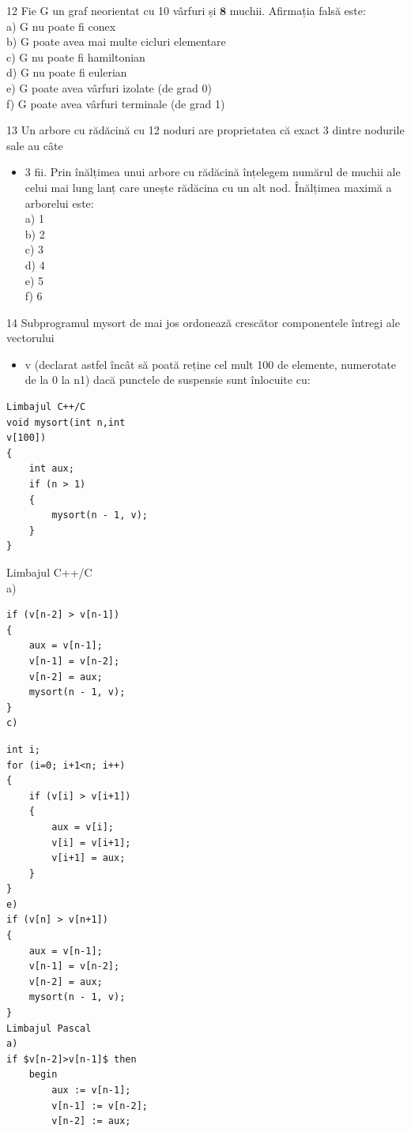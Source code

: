 \documentclass[10pt]{article}
\begin{document}
12 Fie G un graf neorientat cu 10 vârfuri și $\mathbf{8}$ muchii. Afirmația falsă este:\\
a) G nu poate fi conex\\
b) G poate avea mai multe cicluri elementare\\
c) G nu poate fi hamiltonian\\
d) G nu poate fi eulerian\\
e) G poate avea vârfuri izolate (de grad 0)\\
f) G poate avea vârfuri terminale (de grad 1)

13 Un arbore cu rădăcină cu 12 noduri are proprietatea că exact 3 dintre nodurile sale au câte

\begin{itemize}
  \item 3 fii. Prin înălțimea unui arbore cu rădăcină înțelegem numărul de muchii ale celui mai lung lanț care unește rădăcina cu un alt nod. Înălțimea maximă a arborelui este:\\
a) 1\\
b) 2\\
c) 3\\
d) 4\\
e) 5\\
f) 6
\end{itemize}

14 Subprogramul mysort de mai jos ordonează crescător componentele întregi ale vectorului

\begin{itemize}
  \item v (declarat astfel încât să poată reține cel mult 100 de elemente, numerotate de la 0 la n1) dacă punctele de suspensie sunt înlocuite cu:
\end{itemize}

\begin{verbatim}
Limbajul C++/C
void mysort(int n,int
v[100])
{
    int aux;
    if (n > 1)
    {
        mysort(n - 1, v);
    }
}
\end{verbatim}

Limbajul C++/C\\
a)

\begin{verbatim}
if (v[n-2] > v[n-1])
{
    aux = v[n-1];
    v[n-1] = v[n-2];
    v[n-2] = aux;
    mysort(n - 1, v);
}
c)
\end{verbatim}

\begin{verbatim}
int i;
for (i=0; i+1<n; i++)
{
    if (v[i] > v[i+1])
    {
        aux = v[i];
        v[i] = v[i+1];
        v[i+1] = aux;
    }
}
e)
if (v[n] > v[n+1])
{
    aux = v[n-1];
    v[n-1] = v[n-2];
    v[n-2] = aux;
    mysort(n - 1, v);
}
Limbajul Pascal
a)
if $v[n-2]>v[n-1]$ then
    begin
        aux := v[n-1];
        v[n-1] := v[n-2];
        v[n-2] := aux;
\end{verbatim}
\end{document}
